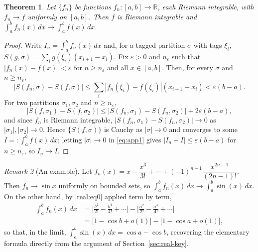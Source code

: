\documentclass[11pt,fleqn]{article}
\def\R{\mathbb R}
\newcommand{\eps}{\varepsilon}
\theoremstyle{plain}
\newtheorem{thm}{Theorem}[section]
\theoremstyle{remark}
\newtheorem{remark}[thm]{Remark}
\begin{document}
\begin{thm}
Let $\{f_n\}$ be functions $f_n\colon[a,b]\to\R$, each Riemann integrable,
with $f_n\to f$ uniformly on $[a,b]$. Then $f$ is Riemann integrable and
$\int_a^bf_n(x)\,dx\to\int_a^bf(x)\,dx$.
\end{thm}
\begin{proof}
Write $I_n=\int_a^bf_n(x)\,dx$ and, for a tagged partition $\sigma$ with
tags $\xi_i$, $S(g,\sigma)=\sum_ig(\xi_i)(x_{i+1}-x_i)$. Fix $\eps>0$ and
$n_\eps$ such that $|f_n(x)-f(x)|<\eps$ for $n\ge n_\eps$ and all
$x\in[a,b]$. Then, for every $\sigma$ and $n\ge n_\eps$,
\begin{equation}\label{eq:app1}
|S(f_n,\sigma)-S(f,\sigma)|\le\sum_i|f_n(\xi_i)-f(\xi_i)|(x_{i+1}-x_i)<\eps(b-a).
\end{equation}
For two partitions $\sigma_1,\sigma_2$ and $n\ge n_\eps$,
\[
|S(f,\sigma_1)-S(f,\sigma_2)|
\le|S(f_n,\sigma_1)-S(f_n,\sigma_2)|+2\eps(b-a),
\]
and since $f_n$ is Riemann integrable, $|S(f_n,\sigma_1)-S(f_n,\sigma_2)|\to0$
as $|\sigma_1|,|\sigma_2|\to0$. Hence $\{S(f,\sigma)\}$ is Cauchy as
$|\sigma|\to0$ and converges to some $I=:\int_a^bf(x)\,dx$; letting
$|\sigma|\to0$ in \eqref{eq:app1} gives $|I_n-I|\le\eps(b-a)$ for
$n\ge n_\eps$, so $I_n\to I$.
\end{proof}

\begin{remark}[An example]
Let $f_n(x)=x-\dfrac{x^3}{3!}+\cdots+(-1)^{n-1}\dfrac{x^{2n-1}}{(2n-1)!}$.
Then $f_n\to\sin x$ uniformly on bounded sets, so
$\int_a^bf_n(x)\,dx\to\int_a^b\sin(x)\,dx$. On the other hand, by
\eqref{real:eq0} applied term by term,
\begin{align*}
\int_a^bf_n(x)\,dx
&=\Big[\frac{b^2}{2!}-\frac{b^4}{4!}+\cdots\Big]-\Big[\frac{a^2}{2!}-\frac{a^4}{4!}+\cdots\Big]\\
&=\Big[1-\cos b+o(1)\Big]-\Big[1-\cos a+o(1)\Big],
\end{align*}
so that, in the limit, $\int_a^b\sin(x)\,dx=\cos a-\cos b$, recovering the
elementary formula directly from the argument of
Section~\ref{sec:real-key}.
\end{remark}
\end{document}
